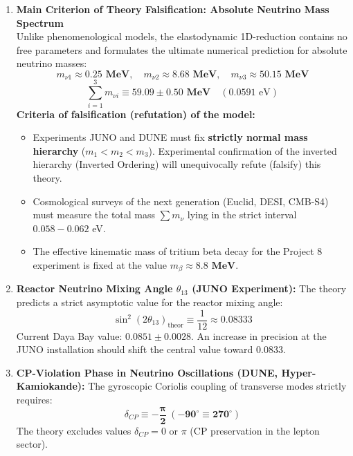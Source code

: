 \documentclass[12pt,a4paper]{article}
\begin{document}
		\begin{enumerate}
			\item \textbf{Main Criterion of Theory Falsification: Absolute Neutrino Mass Spectrum} \\
			Unlike phenomenological models, the elastodynamic 1D-reduction contains no free parameters and formulates the ultimate numerical prediction for absolute neutrino masses:
			\begin{equation}
				m_{\nu 1} \approx \mathbf{0.25 \text{ MeV}}, \quad m_{\nu 2} \approx \mathbf{8.68 \text{ MeV}}, \quad m_{\nu 3} \approx \mathbf{50.15 \text{ MeV}}
			\end{equation}
			\begin{equation}
				\sum_{i=1}^3 m_{\nu i} \equiv \mathbf{59.09 \pm 0.50 \text{ MeV}} \quad (0.0591 \text{ eV})
			\end{equation}
			\textbf{Criteria of falsification (refutation) of the model:}
			\begin{itemize}
				\item Experiments JUNO and DUNE must fix \textbf{strictly normal mass hierarchy} ($m_1 < m_2 < m_3$). Experimental confirmation of the inverted hierarchy (Inverted Ordering) will unequivocally refute (falsify) this theory.
				\item Cosmological surveys of the next generation (Euclid, DESI, CMB-S4) must measure the total mass $\sum m_\nu$ lying in the strict interval $0.058 - 0.062$ eV.
				\item The effective kinematic mass of tritium beta decay for the Project 8 experiment is fixed at the value $m_\beta \approx \mathbf{8.8 \text{ MeV}}$.
			\end{itemize}
			\item \textbf{Reactor Neutrino Mixing Angle $\theta_{13}$ (JUNO Experiment):}
			The theory predicts a strict asymptotic value for the reactor mixing angle:
			\begin{equation}
				\sin^2(2\theta_{13})_{\text{theor}} \equiv \frac{1}{12} \approx \mathbf{0.08333}
			\end{equation}
			Current Daya Bay value: $0.0851 \pm 0.0028$. An increase in precision at the JUNO installation should shift the central value toward $0.0833$.
			
			\item \textbf{CP-Violation Phase in Neutrino Oscillations (DUNE, Hyper-Kamiokande):}
			The gyroscopic Coriolis coupling of transverse modes strictly requires:
			\begin{equation}
				\delta_{CP} \equiv \mathbf{-\frac{\pi}{2} \ (-90^\circ \equiv 270^\circ)}
			\end{equation}
			The theory excludes values $\delta_{CP} = 0$ or $\pi$ (CP preservation in the lepton sector).
			

\end{enumerate}
\end{document}
